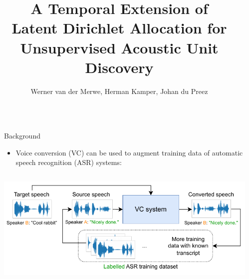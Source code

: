 \documentclass[final]{beamer}
\title{A Temporal Extension of \\Latent Dirichlet Allocation for \\Unsupervised Acoustic Unit Discovery}
\author{Werner van der Merwe, Herman Kamper, Johan du Preez}
\institute{MediaLab, E\&E Engineering, Stellenbosch University, South Africa}
\newlength{\columnheight}
\begin{document}
\begin{frame}[t]
\begin{columns}[T]

\begin{column}{.01\linewidth}\end{column} %


\begin{column}{.33\linewidth}
\centering
\begin{minipage}[T]{.97\textwidth}\parbox[t][\columnheight]{\textwidth}{

\begin{block}{Background}

    \begin{itemize}
        \setlength{\itemsep}{0.5ex}
        \item Voice conversion (VC) can be used to augment training data of automatic speech recognition (ASR) systems:
    \end{itemize}
    
    
    \begin{columns}[c]
        
        \begin{center}
             \includegraphics[width=1.0\textwidth]{figures/data_aug_diagram_v2.pdf}
        \end{center}
        
    \end{columns}
    
    \vspace{1ex}

    \begin{itemize}
        \setlength{\itemsep}{0.5ex}
        

\end{itemize}
\end{block}}
\end{minipage}
\end{column}
\end{columns}
\end{frame}
\end{document}
